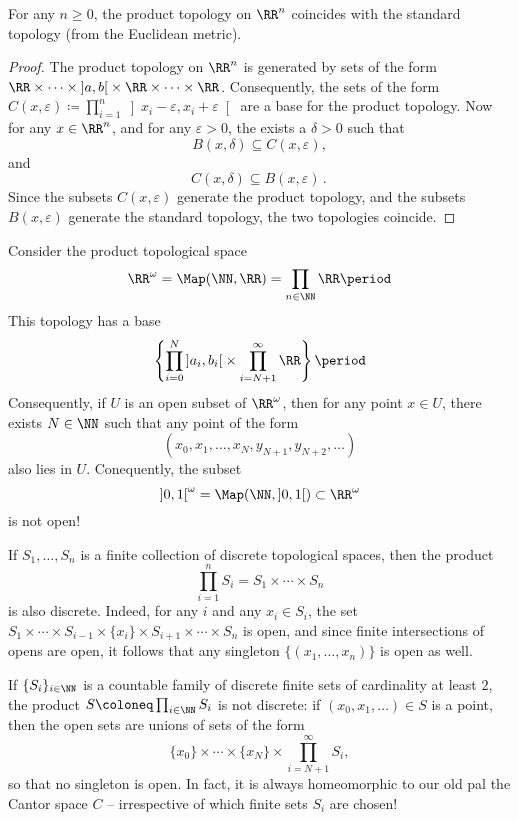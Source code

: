 \begin{prp}
	For any $n\geq 0$, the product topology on $\RR^n$ coincides with the standard topology (from the Euclidean metric).
\end{prp}
\begin{proof}
	The product topology on $\RR^n$ is generated by sets of the form $\RR\times\cdots\times \left]a,b\right[\times\RR\times\cdots\times\RR$.
	Consequently, the sets of the form $C(x,\varepsilon) \coloneq \prod_{i=1}^n\left]x_i-\varepsilon,x_i+\varepsilon\right[$ are a base for the product topology.
	Now for any $x \in \RR^n$, and for any $\varepsilon>0$, the exists a $\delta>0$ such that
	\[
		B(x,\delta) \subseteq C(x,\varepsilon) \comma
	\]
	and
	\[
		C(x,\delta) \subseteq B(x,\varepsilon) \period
	\]
	Since the subsets $C(x, \varepsilon)$ generate the product topology, and the subsets $B(x,\varepsilon)$ generate the standard topology, the two topologies coincide.
\end{proof}

\begin{wrn}
	Consider the product topological space
	\[
		\RR^{\omega} = \Map(\NN,\RR) = \prod_{n \in \NN} \RR \period
	\]
	This topology has a base
	\[
		\left\{ \prod_{i=0}^N \left]a_i, b_i\right[ \times \prod_{i=N+1}^{\infty} \RR \right\} \period
	\]
	Consequently, if $U$ is an open subset of $\RR^{\omega}$,
	then for any point $x \in U$, there exists $N \in \NN$ such that any point of the form
	\[
		(x_0,x_1,\dots,x_N,y_{N+1},y_{N+2},\dots)
	\]
	also lies in $U$.
	Conequently, the subset
	\[
		\left]0,1\right[^{\omega} = \Map(\NN, \left]0,1\right[) \subset \RR^{\omega}
	\]
	is not open!
\end{wrn}

\begin{exm}
	If $S_1,\dots,S_n$ is a finite collection of discrete topological spaces, then the product
	\[
		\prod_{i=1}^n S_i = S_1 \times \cdots \times S_n
	\]
	is also discrete.
	Indeed, for any $i$ and any $ x_i \in S_i $, the set $S_1 \times \cdots \times S_{i-1} \times \{x_i\} \times S_{i+1} \times \cdots \times S_n $ is open, and since finite intersections of opens are open, it follows that any singleton $\{(x_1, \dots, x_n)\}$ is open as well.
\end{exm}

\begin{wrn}
	If $\{S_i\}_{i\in\NN}$ is a countable family of discrete finite sets of cardinality at least $2$, the product $S \coloneq \prod_{i \in \NN} S_i$ is not discrete:
	if $(x_0, x_1, \dots) \in S$ is a point, then the open sets are unions of sets of the form
	\[
		\{x_0\} \times \cdots \times \{x_N\} \times \prod_{i=N+1}^{\infty} S_i \comma
	\]
	so that no singleton is open.
	In fact, it is always homeomorphic to our old pal the Cantor space $C$ -- irrespective of which finite sets $S_i$ are chosen!%
\end{wrn}


